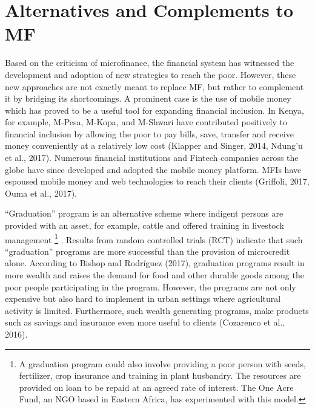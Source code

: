 \documentclass[a4paper, nobind]{templates/ociamthesis}
\begin{document}
\hypertarget{alternatives-and-complements-to-mf}{%
\section{Alternatives and Complements to MF}\label{alternatives-and-complements-to-mf}}

\noindent Based on the criticism of microfinance, the financial system has witnessed the development and adoption of new strategies to reach the poor. However, these new approaches are not exactly meant to replace MF, but rather to complement it by bridging its shortcomings. A prominent case is the use of mobile money which has proved to be a useful tool for expanding financial inclusion. In Kenya, for example, M-Pesa, M-Kopa, and M-Shwari have contributed positively to financial inclusion by allowing the poor to pay bills, save, transfer and receive money conveniently at a relatively low cost (Klapper and Singer, 2014, Ndung'u et al., 2017). Numerous financial institutions and Fintech companies across the globe have since developed and adopted the mobile money platform. MFIs have espoused mobile money and web technologies to reach their clients (Griffoli, 2017, Ouma et al., 2017).

``Graduation'' program is an alternative scheme where indigent persons are provided with an asset, for example, cattle and offered training in livestock management \footnote{A graduation program could also involve providing a poor person with seeds, fertilizer, crop insurance and training in plant husbandry. The resources are provided on loan to be repaid at an agreed rate of interest. The One Acre Fund, an NGO based in Eastern Africa, has experimented with this model.} . Results from random controlled trials (RCT) indicate that such ``graduation'' programs are more successful than the provision of microcredit alone. According to Bishop and Rodríguez (2017), graduation programs result in more wealth and raises the demand for food and other durable goods among the poor people participating in the program. However, the programs are not only expensive but also hard to implement in urban settings where agricultural activity is limited. Furthermore, such wealth generating programs, make products such as savings and insurance even more useful to clients (Cozarenco et al., 2016).
\end{document}
